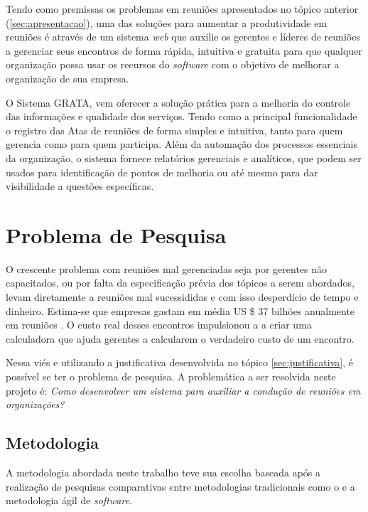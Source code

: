 Tendo como premissas os problemas em reuniões apresentados no tópico anterior (\ref{sec:apresentacao}), uma das soluções para aumentar a produtividade em reuniões é através de um sistema \textit{web} que auxilie os gerentes e líderes de reuniões a gerenciar seus encontros de forma rápida, intuitiva e gratuita para que qualquer organização possa usar os recursos do \textit{software} com o objetivo de melhorar a organização de sua empresa.

O Sistema GRATA, vem oferecer a solução prática para a melhoria do controle das informações e qualidade dos serviços. Tendo como a principal funcionalidade o registro das Atas de reuniões de forma simples e intuitiva, tanto para quem gerencia como para quem participa. Além da automação dos processos essenciais da organização, o sistema fornece relatórios gerenciais e analíticos, que podem ser usados para identificação de pontos de melhoria ou até mesmo para dar visibilidade a questões específicas.

\section{Problema de Pesquisa}
\label{sec:problema_de_pesquisa}

O crescente problema com reuniões mal gerenciadas seja por gerentes não capacitados, ou por falta da especificação prévia dos tópicos a serem abordados, levam diretamente a reuniões mal sucessididas e com isso desperdício de tempo e dinheiro. Estima-se que empresas gastam em média US \$ 37 bilhões anualmente em reuniões \cite{baer}. O custo real desses encontros impulsionou a \cite{harvard} a criar uma calculadora que ajuda gerentes a calcularem o verdadeiro custo de um encontro.

Nessa viés e utilizando a justificativa desenvolvida no tópico \ref{sec:justificativa}, é possível se ter o problema de pesquisa. A problemática a ser resolvida neste projeto é: \textit{Como desenvolver um sistema para auxiliar a condução de reuniões em organizações?}

\subsection{Metodologia}
\label{sec:metodologia_introducao}

A metodologia abordada neste trabalho teve sua escolha baseada após a realização de pesquisas comparativas entre metodologias tradicionais como o \cite{pmbok} e a metodologia ágil de \textit{software}.

